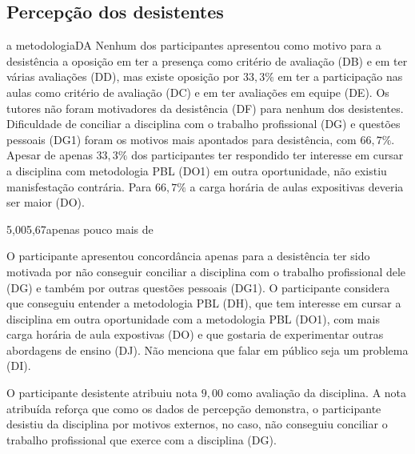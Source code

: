 \subsection{Percepção dos desistentes}
%
{a metodologia}{DA}{}{}
Nenhum dos participantes apresentou como motivo para a desistência a
oposição em ter a presença como critério de avaliação (DB) e
em ter várias avaliações (DD), mas existe oposição por $33,3\%$
em ter a participação nas aulas como critério de avaliação (DC) e em ter
avaliações em equipe (DE).
Os tutores não foram motivadores da desistência (DF) para nenhum
dos desistentes.
Dificuldade de conciliar a disciplina com
o trabalho profissional (DG) e questões pessoais (DG1)
foram os motivos mais apontados para desistência,
com $66,7\%$.
Apesar de apenas $33,3\%$ dos participantes ter respondido ter interesse
em cursar a disciplina com metodologia PBL (DO1) em outra oportunidade,
não existiu manisfestação contrária.
Para $66,7\%$ a carga horária de aulas expositivas deveria ser maior (DO).

{5,00}{5,67}{apenas pouco mais de}

O participante apresentou concordância apenas para a desistência ter sido motivada
por não conseguir conciliar a disciplina com o trabalho profissional
dele (DG) e também por outras questões pessoais (DG1).
O participante considera que conseguiu entender a metodologia PBL (DH),
que tem interesse em cursar a disciplina em outra oportunidade com
a metodologia PBL (DO1), com mais carga horária de aula expostivas (DO) e
que gostaria de experimentar outras abordagens de ensino (DJ).
Não menciona que falar em público seja um problema (DI).


O participante desistente atribuiu nota $9,00$ como avaliação da
disciplina.
A nota atribuída reforça que como os dados de percepção demonstra,
o participante desistiu da disciplina por motivos externos, no caso,
não conseguiu conciliar o trabalho profissional que exerce com
a disciplina (DG).

